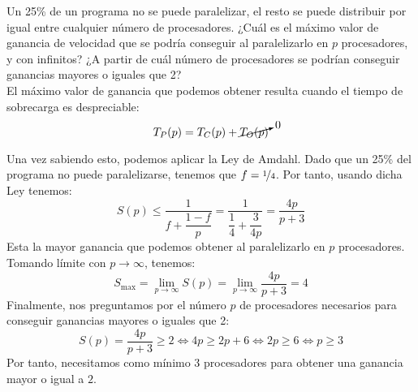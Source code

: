 \begin{ejercicio}
    Un 25\% de un programa no se puede paralelizar, el resto se puede distribuir por igual entre
    cualquier número de procesadores. ¿Cuál es el máximo valor de ganancia de velocidad que se podría
    conseguir al paralelizarlo en $p$ procesadores, y con infinitos? ¿A partir de cuál número de procesadores se
    podrían conseguir ganancias mayores o iguales que 2?\\

    El máximo valor de ganancia que podemos obtener resulta cuando el tiempo de sobrecarga es despreciable:
    \begin{equation*}
        T_P(p) = T_C(p) + \cancelto{0}{T_O(p)}
    \end{equation*}

    Una vez sabiendo esto, podemos aplicar la Ley de Amdahl. Dado que un 25\% del programa no puede paralelizarse, tenemos que $f=\nicefrac{1}{4}$. Por tanto, usando dicha Ley tenemos:
    \begin{equation*}
        S(p) \leq \dfrac{1}{f+\dfrac{1-f}{p}} = \dfrac{1}{\dfrac{1}{4}+\dfrac{3}{4p}} = \dfrac{4p}{p+3}
    \end{equation*}
    Esta la mayor ganancia que podemos obtener al paralelizarlo en $p$ procesadores. Tomando límite con $p\to \infty$, tenemos:
    \begin{equation*}
        S_{\max} = \lim_{p\to\infty}S(p) = \lim_{p\to\infty}\dfrac{4p}{p+3} = 4
    \end{equation*}
    Finalmente, nos preguntamos por el número $p$ de procesadores necesarios para conseguir ganancias mayores o iguales que 2:
    \begin{equation*}
        S(p) = \dfrac{4p}{p+3} \geq 2 \Longleftrightarrow 4p\geq 2p+6\Longleftrightarrow 2p\geq 6 \Longleftrightarrow p\geq 3
    \end{equation*}
    Por tanto, necesitamos como mínimo 3 procesadores para obtener una ganancia mayor o igual a $2$.
\end{ejercicio}

